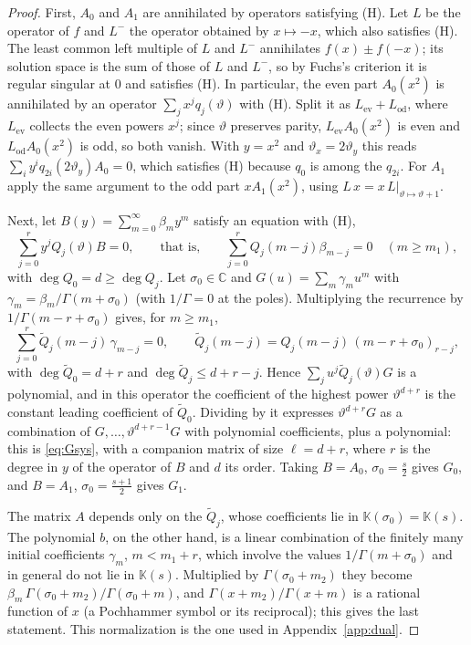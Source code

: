 \documentclass[11pt,reqno]{amsart}
\theoremstyle{definition}
\theoremstyle{remark}
\newcommand{\CC}{\mathbb{C}}
\begin{document}
\begin{proof}
First, $A_0$ and $A_1$ are annihilated by operators satisfying (H). Let $L$ be the
operator of $f$ and $L^-$ the operator obtained by $x \mapsto -x$, which also satisfies (H). The least common left
multiple of $L$ and $L^-$ annihilates $f(x) \pm f(-x)$; its solution space is the sum of those of $L$ and $L^-$, so by
Fuchs's criterion it is regular singular at $0$ and satisfies (H). In particular, the even part $A_0(x^2)$ is annihilated by an
operator $\sum_jx^jq_j(\vartheta)$ with (H). Split it as $L_{\mathrm{ev}} + L_{\mathrm{od}}$, where $L_{\mathrm{ev}}$
collects the even powers $x^j$; since $\vartheta$ preserves parity, $L_{\mathrm{ev}}A_0(x^2)$ is even and
$L_{\mathrm{od}}A_0(x^2)$ is odd, so both vanish. With $y = x^2$ and $\vartheta_x = 2\vartheta_y$ this reads
$\sum_iy^iq_{2i}(2\vartheta_y)A_0 = 0$, which satisfies (H) because $q_0$ is among the $q_{2i}$. For $A_1$ apply the
same argument to the odd part $xA_1(x^2)$, using $L\,x = x\,L|_{\vartheta\mapsto\vartheta+1}$.

Next, let $B(y) = \sum_{m=0}^{\infty}\beta_my^m$ satisfy an equation with (H),
\[
  \sum_{j=0}^{r}y^jQ_j(\vartheta)B = 0, \qquad\text{that is,}\qquad
  \sum_{j=0}^{r}Q_j(m-j)\beta_{m-j} = 0 \quad (m \ge m_1),
\]
with $\deg Q_0 = d \ge \deg Q_j$. Let $\sigma_0 \in \CC$ and $G(u) = \sum_m\gamma_mu^m$ with
$\gamma_m = \beta_m/\Gamma(m+\sigma_0)$ (with $1/\Gamma = 0$ at the poles). Multiplying the recurrence by
$1/\Gamma(m-r+\sigma_0)$ gives, for $m \ge m_1$,
\[
  \sum_{j=0}^{r}\widetilde Q_j(m-j)\,\gamma_{m-j} = 0, \qquad
  \widetilde Q_j(m-j) = Q_j(m-j)\,(m-r+\sigma_0)_{r-j},
\]
with $\deg\widetilde Q_0 = d+r$ and $\deg\widetilde Q_j \le d+r-j$. Hence $\sum_ju^j\widetilde Q_j(\vartheta)G$ is a
polynomial, and in this operator the coefficient of the highest power $\vartheta^{d+r}$ is the constant leading
coefficient of $\widetilde Q_0$. Dividing by it expresses $\vartheta^{d+r}G$ as a combination of
$G, \dots, \vartheta^{d+r-1}G$ with polynomial coefficients, plus a polynomial: this is \eqref{eq:Gsys}, with a
companion matrix of size $\ell = d + r$, where $r$ is the degree in $y$ of the operator of $B$ and $d$ its order. Taking $B = A_0$, $\sigma_0 = \frac s2$ gives $G_0$, and $B = A_1$, $\sigma_0 = \frac{s+1}2$ gives
$G_1$.

The matrix $A$ depends only on the $\widetilde Q_j$, whose coefficients lie in $\mathbb K(\sigma_0) = \mathbb K(s)$.
The polynomial $b$, on the other hand, is a linear combination of the finitely many initial coefficients
$\gamma_m$, $m < m_1 + r$, which involve the values $1/\Gamma(m+\sigma_0)$ and in general do not lie in
$\mathbb K(s)$. Multiplied by $\Gamma(\sigma_0+m_2)$ they become $\beta_m\,\Gamma(\sigma_0+m_2)/\Gamma(\sigma_0+m)$, and
$\Gamma(x+m_2)/\Gamma(x+m)$ is a rational function of $x$ (a Pochhammer symbol or its reciprocal); this gives the
last statement. This normalization is the one used in Appendix~\ref{app:dual}.
\end{proof}
\end{document}
